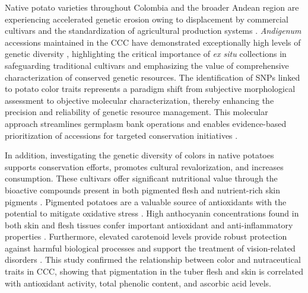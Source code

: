 \documentclass[pdflatex,sn-mathphys-ay]{sn-jnl}%
\begin{document}


Native potato varieties throughout Colombia and the broader Andean region are experiencing accelerated genetic erosion owing to displacement by commercial cultivars and the standardization of agricultural production systems \citep{arcespatial,ellis2018genetic}. \textit{Andigenum} accessions maintained in the CCC have demonstrated exceptionally high levels of genetic diversity \citep{Berdugo2017}, highlighting the critical importance of \textit{ex situ} collections in safeguarding traditional cultivars and emphasizing the value of comprehensive characterization of conserved genetic resources. The identification of SNPs linked to potato color traits represents a paradigm shift from subjective morphological assessment to objective molecular characterization, thereby enhancing the precision and reliability of genetic resource management. This molecular approach streamlines germplasm bank operations and enables evidence-based prioritization of accessions for targeted conservation initiatives \citep{ellis2018genetic}.



In addition, investigating the genetic diversity of colors in native potatoes supports conservation efforts, promotes cultural revalorization, and increases consumption. These cultivars offer significant nutritional value through the bioactive compounds present in both pigmented flesh and nutrient-rich skin pigments \citep{bvenura2022pigmented}.  Pigmented potatoes are a valuable source of antioxidants with the potential to mitigate oxidative stress \citep{andre2007andean}. High anthocyanin concentrations found in both skin and flesh tissues confer important antioxidant and anti-inflammatory properties \citep{brown2008variability}. Furthermore, elevated carotenoid levels provide robust protection against harmful biological processes and support the treatment of vision-related disorders \citep{bvenura2022pigmented,burgos2020potato,vollmer2022world}. This study confirmed the relationship between color and nutraceutical traits in CCC, showing that pigmentation in the tuber flesh and skin is correlated with antioxidant activity, total phenolic content, and ascorbic acid levels.
\end{document}
